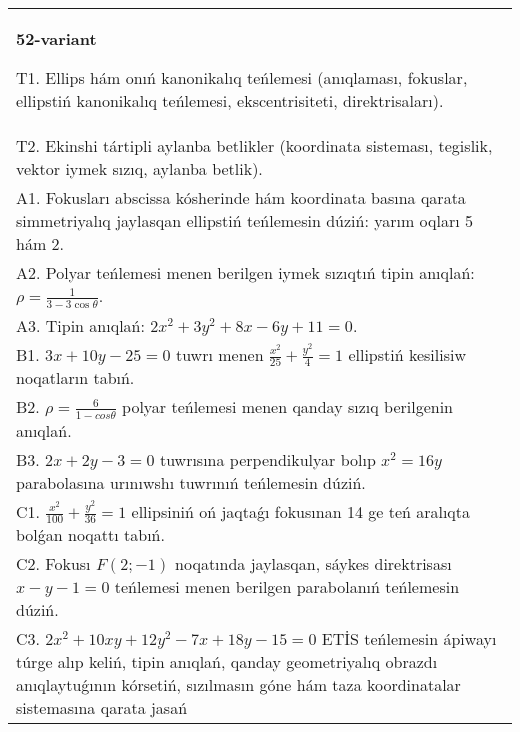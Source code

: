 \documentclass{article}
\begin{document}
\begin{tabular}{m{17cm}}
\textbf{52-variant}
\newline

T1. Ellips hám onıń kanonikalıq teńlemesi (anıqlaması, fokuslar, ellipstiń kanonikalıq teńlemesi, ekscentrisiteti, direktrisaları).\\

T2. Ekinshi tártipli aylanba betlikler (koordinata sisteması, tegislik, vektor iymek sızıq, aylanba betlik).\\

A1. Fokusları abscissa kósherinde hám koordinata basına qarata simmetriyalıq jaylasqan ellipstiń teńlemesin dúziń: yarım oqları 5 hám 2.\\

A2. Polyar teńlemesi menen berilgen iymek sızıqtıń tipin anıqlań: $\rho=\frac{1}{3-3\cos\theta}$.\\

A3. Tipin anıqlań: $2 x^{2}+3 y^{2}+8 x-6 y+11=0$.\\

B1. $3x + 10y - 25 = 0$ tuwrı menen $\frac{x^{2}}{25} + \frac{y^{2}}{4} = 1$ ellipstiń kesilisiw noqatların tabıń.\\

B2. $\rho = \frac{6}{1 - cos\theta}$ polyar teńlemesi menen qanday sızıq berilgenin anıqlań.  \\

B3. $2x + 2y - 3 = 0$ tuwrısına perpendikulyar bolıp $x^{2} = 16y$ parabolasına urınıwshı tuwrınıń teńlemesin dúziń.  \\

C1. $\frac{x^{2}}{100} + \frac{y^{2}}{36} = 1$ ellipsiniń oń jaqtaǵı fokusınan 14 ge teń aralıqta bolǵan noqattı tabıń.  \\

C2. Fokusı $F(2; - 1)$ noqatında jaylasqan, sáykes direktrisası $x - y - 1 = 0$ teńlemesi menen berilgen parabolanıń teńlemesin dúziń.  \\

C3. $2x^{2} + 10xy + 12y^{2} - 7x + 18y - 15 = 0$ ETİS teńlemesin ápiwayı túrge alıp keliń, tipin anıqlań, qanday geometriyalıq obrazdı anıqlaytuǵının kórsetiń, sızılmasın góne hám taza koordinatalar sistemasına qarata jasań  \\

\end{tabular}
\vspace{1cm}
\end{document}
